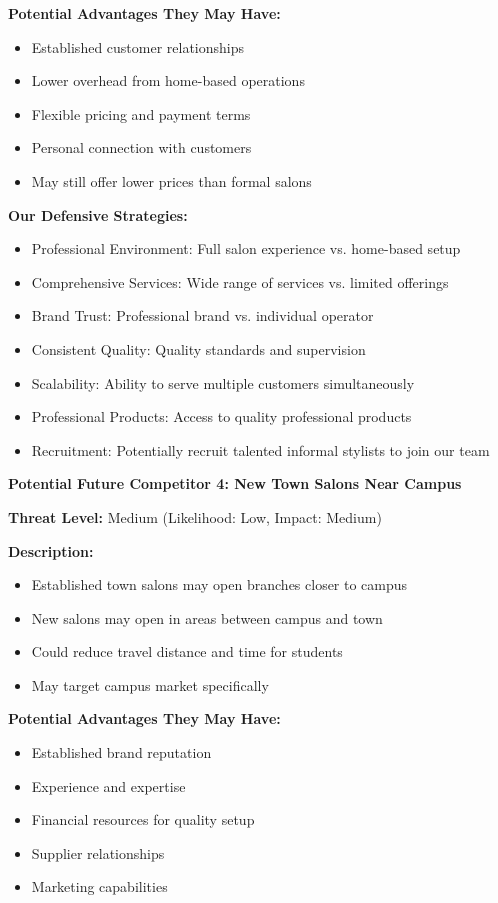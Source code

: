 \documentclass[a4paper,12pt]{article}
\begin{document}
\textbf{Potential Advantages They May Have:}
\begin{itemize}[leftmargin=2em]
    \item Established customer relationships
    \item Lower overhead from home-based operations
    \item Flexible pricing and payment terms
    \item Personal connection with customers
    \item May still offer lower prices than formal salons
\end{itemize}

\textbf{Our Defensive Strategies:}
\begin{itemize}[leftmargin=2em]
    \item Professional Environment: Full salon experience vs. home-based setup
    \item Comprehensive Services: Wide range of services vs. limited offerings
    \item Brand Trust: Professional brand vs. individual operator
    \item Consistent Quality: Quality standards and supervision
    \item Scalability: Ability to serve multiple customers simultaneously
    \item Professional Products: Access to quality professional products
    \item Recruitment: Potentially recruit talented informal stylists to join our team
\end{itemize}

\vspace{1em}

\textbf{Potential Future Competitor 4: New Town Salons Near Campus}

\textbf{Threat Level:} Medium (Likelihood: Low, Impact: Medium)

\textbf{Description:}
\begin{itemize}[leftmargin=2em]
    \item Established town salons may open branches closer to campus
    \item New salons may open in areas between campus and town
    \item Could reduce travel distance and time for students
    \item May target campus market specifically
\end{itemize}

\textbf{Potential Advantages They May Have:}
\begin{itemize}[leftmargin=2em]
    \item Established brand reputation
    \item Experience and expertise
    \item Financial resources for quality setup
    \item Supplier relationships
    \item Marketing capabilities
\end{itemize}
\end{document}
